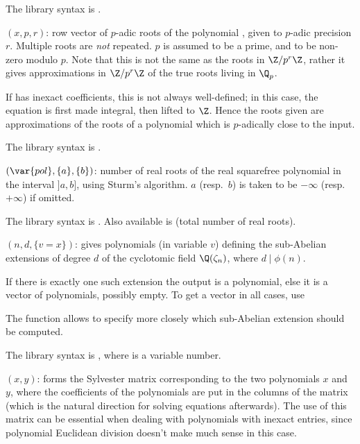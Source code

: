 The library syntax is .

$(x,p,r)$: \label{se:polrootspadic}row vector of $p$-adic roots of
the polynomial , given to $p$-adic precision $r$. Multiple roots are
\emph{not} repeated. $p$ is assumed to be a prime, and  to be
non-zero modulo $p$. Note that this is not the same as the roots in
$\Z/p^r\Z$, rather it gives approximations in $\Z/p^r\Z$ of the true
roots living in $\Q_p$.

If  has inexact  coefficients, this is not always
well-defined; in this case, the equation is first made integral, then lifted
to $\Z$. Hence the roots given are approximations of the roots of a
polynomial which is $p$-adically close to the input.

The library syntax is .

$(\var{pol},\{a\},\{b\})$: \label{se:polsturm}number of real roots of the real squarefree polynomial  in the
interval $]a,b]$, using Sturm's algorithm. $a$ (resp.~$b$) is taken to be
$-\infty$ (resp.~$+\infty$) if omitted.

The library syntax is .
Also available is  (total number of real
roots).

$(n,d,\{v=x\})$: \label{se:polsubcyclo}gives polynomials (in variable
$v$) defining the sub-Abelian extensions of degree $d$ of the cyclotomic
field $\Q(\zeta_n)$, where $d\mid \phi(n)$.

If there is exactly one such extension the output is a polynomial, else it is
a vector of polynomials, possibly empty. To get a vector in all cases,
use 

The function  allows to specify more closely which
sub-Abelian extension should be computed.

The library syntax is , where  is a variable number.

$(x,y)$: \label{se:polsylvestermatrix}forms the Sylvester matrix
corresponding to the two polynomials $x$ and $y$, where the coefficients of
the polynomials are put in the columns of the matrix (which is the natural
direction for solving equations afterwards). The use of this matrix can be
essential when dealing with polynomials with inexact entries, since
polynomial Euclidean division doesn't make much sense in this case.

